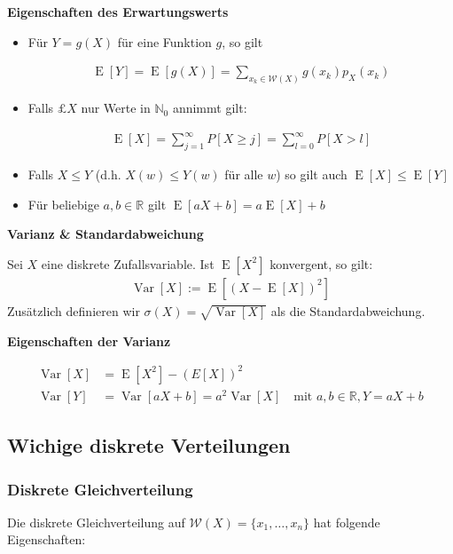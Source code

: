 \documentclass[25pt]{sciposter}
\newcommand{\R}{\mathbb{R}}
\newcommand{\N}{\mathbb{N}}
\newcommand{\W}{\mathcal{W}}
\newcommand{\Var}{\operatorname{Var}}
\newcommand{\E}{\operatorname{E}}
\newenvironment{method}[1]{\begin{mdframed}[backgroundcolor=blue!10,innertopmargin=15pt, innerbottommargin=15pt,nobreak=true]
		\textbf{#1 }
	}
	{ 
	\end{mdframed}
}
\newenvironment{thm}[1]{\begin{mdframed}[backgroundcolor=pink!50,innertopmargin=15pt, innerbottommargin=15pt, nobreak=true]
		\textbf{#1 }
	}
	{ 
	\end{mdframed}
}
\begin{document}
\begin{multicols}{3}
\begin{thm}{Eigenschaften des Erwartungswerts}
\begin{itemize}
	\item Für $Y = g(X)$ für eine Funktion $g$, so gilt 
	
	\begin{align*}
		\E[Y] = \E[g(X)] = \sum_{x_k\in\W(X)} g(x_k)p_X(x_k)
	\end{align*}
	\item Falls $£X$ nur Werte in $\N_0$ annimmt gilt:
	
	\begin{align*}
		\E[X] = \sum_{j=1}^{\infty} P[X \geq j] = \sum_{l=0}^{\infty} P[X > l]
	\end{align*}
	\item Falls $X \leq Y$  (d.h. $X(w) \leq Y(w)$ für alle $w$) so gilt auch $\E[X] \leq \E[Y]$
	\item Für beliebige $a,b \in \R$ gilt $\E[aX + b] = a\E[X] + b$
\end{itemize}
\end{thm}



\begin{method}{Varianz \& Standardabweichung}
Sei $X$ eine diskrete Zufallsvariable. Ist $\E[X^2]$ konvergent, so gilt:
\begin{align*}
	\Var[X] := \E[(X-\E[X])^2]
\end{align*}
Zusätzlich definieren wir $\sigma(X) = \sqrt{\Var[X]}$ als die Standardabweichung.
\end{method}



\begin{thm}{Eigenschaften der Varianz}
	\begin{align*}
	\Var[X] &= \E[X^2] - (E[X])^2\\
	\Var[Y] &=\Var[aX+b] = a^2 \Var[X] \quad \text{mit } a,b\in\R , Y = aX+b
	\end{align*}
\end{thm}



\subsection*{Wichige diskrete Verteilungen}

\subsubsection*{Diskrete Gleichverteilung}
Die diskrete Gleichverteilung auf  $\W(X)=\{x_1,\ldots,x_n\}$ hat folgende Eigenschaften:


\end{multicols}
\end{document}
